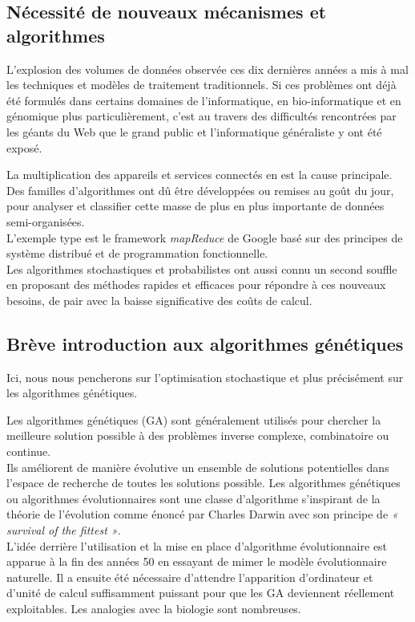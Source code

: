 \documentclass[french, 11pt]{memoir}
\begin{document}
\subsection{Nécessité de nouveaux mécanismes et
	algorithmes}\label{nuxe9cessituxe9-de-nouveaux-muxe9canismes-et-algorithmes}

L'explosion des volumes de données observée ces dix dernières années a
mis à mal les techniques et modèles de traitement traditionnels. Si ces
problèmes ont déjà été formulés dans certains domaines de
l'informatique, en bio-informatique et en génomique plus
particulièrement, c'est au travers des difficultés rencontrées par les
géants du Web que le grand public et l'informatique généraliste y ont
été exposé.

\bigskip
La multiplication des appareils et services connectés en est la cause
principale. Des familles d'algorithmes ont dû être développées ou
remises au goût du jour, pour analyser et classifier cette masse de plus
en plus importante de données semi-organisées. \\
L'exemple type est le
framework \emph{mapReduce} de Google basé sur des principes de système
distribué et de programmation fonctionnelle.\\
Les algorithmes
stochastiques et probabilistes ont aussi connu un second souffle en
proposant des méthodes rapides et efficaces pour répondre à ces nouveaux
besoins, de pair avec la baisse significative des coûts de calcul.

\subsection{Brève introduction aux algorithmes
	génétiques}\label{bruxe8ve-introduction-aux-algorithmes-guxe9nuxe9tiques}

Ici, nous nous pencherons sur l'optimisation stochastique et plus
précisément sur les algorithmes génétiques.

\bigskip
Les algorithmes génétiques (GA) sont généralement utilisés pour chercher
la meilleure solution possible à des problèmes inverse complexe,
combinatoire ou continue.\\
Ils améliorent de manière évolutive un ensemble de solutions
potentielles dans l'espace de recherche de toutes les solutions
possible. Les algorithmes génétiques ou algorithmes évolutionnaires sont
une classe d'algorithme s'inspirant de la théorie de l'évolution comme
énoncé par Charles Darwin avec son principe de \emph{« survival of the
	fittest »}.\\
L'idée derrière l'utilisation et la mise en place
d'algorithme évolutionnaire est apparue à la fin des années 50 en
essayant de mimer le modèle évolutionnaire naturelle. Il a ensuite été
nécessaire d'attendre l'apparition d'ordinateur et d'unité de calcul
suffisamment puissant pour que les GA deviennent réellement
exploitables. Les analogies avec la biologie sont nombreuses.
\end{document}
